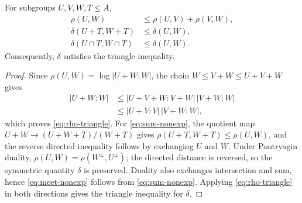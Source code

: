 \documentclass[10pt,a4paper]{amsart}
\begin{document}
\begin{lemma}\label{lem:distance}
For subgroups $U,V,W,T\le A$,
\begin{align}
 \rho(U,W)&\le \rho(U,V)+\rho(V,W),\label{eq:rho-triangle}\\
 \delta(U+T,W+T)&\le \delta(U,W),\label{eq:sum-nonexp}\\
 \delta(U\cap T,W\cap T)&\le \delta(U,W).\label{eq:meet-nonexp}
\end{align}
Consequently, $\delta$ satisfies the triangle inequality.
\end{lemma}

\begin{proof}
Since $\rho(U,W)=\log|U+W:W|$, the chain
$W\le V+W\le U+V+W$ gives
\begin{align*}
 |U+W:W|
 &\le |U+V+W:V+W|\,|V+W:W|\\
 &\le |U+V:V|\,|V+W:W|,
\end{align*}
which proves \eqref{eq:rho-triangle}.  For \eqref{eq:sum-nonexp}, the quotient
map $U+W\to(U+W+T)/(W+T)$ gives
$\rho(U+T,W+T)\le\rho(U,W)$, and the reverse directed inequality follows by
exchanging $U$ and $W$.  Under Pontryagin duality,
$\rho(U,W)=\rho(W^\perp,U^\perp)$; the directed distance is reversed, so the
symmetric quantity $\delta$ is preserved.  Duality also exchanges intersection
and sum, hence \eqref{eq:meet-nonexp} follows from \eqref{eq:sum-nonexp}.
Applying \eqref{eq:rho-triangle} in both directions gives the triangle
inequality for $\delta$.
\end{proof}
\end{document}
